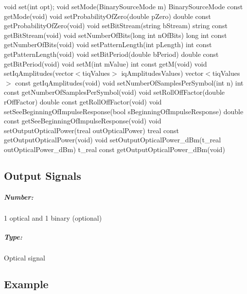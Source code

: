 void set(int opt);
\bigbreak
void setMode(BinarySourceMode m)
\bigbreak
BinarySourceMode const getMode(void)
\bigbreak
void setProbabilityOfZero(double pZero)
\bigbreak
double const getProbabilityOfZero(void)
\bigbreak
void setBitStream(string bStream)
\bigbreak
string const getBitStream(void)
\bigbreak
void setNumberOfBits(long int nOfBits)
\bigbreak
long int const getNumberOfBits(void)
\bigbreak
void setPatternLength(int pLength)
\bigbreak
int const getPatternLength(void)
\bigbreak
void setBitPeriod(double bPeriod)
\bigbreak
double const getBitPeriod(void)
\bigbreak
void setM(int mValue)
int const getM(void)
\bigbreak
void setIqAmplitudes(vector$<$t\textunderscore iqValues$>$ iqAmplitudesValues)
\bigbreak
vector$<$t\textunderscore iqValues$>$ const getIqAmplitudes(void)
\bigbreak
void setNumberOfSamplesPerSymbol(int n)
\bigbreak
int const getNumberOfSamplesPerSymbol(void)
\bigbreak
void setRollOffFactor(double rOffFactor)
\bigbreak
double const getRollOffFactor(void)
\bigbreak
void setSeeBeginningOfImpulseResponse(bool sBeginningOfImpulseResponse)
\bigbreak
double const getSeeBeginningOfImpulseResponse(void)
\bigbreak
void setOutputOpticalPower(t\textunderscore real outOpticalPower)
\bigbreak
t\textunderscore real const getOutputOpticalPower(void)
\bigbreak
void setOutputOpticalPower\_dBm(t\_real outOpticalPower\_dBm)
\bigbreak
t\_real const getOutputOpticalPower\_dBm(void)
\pagebreak

\subsection*{Output Signals}

\subparagraph*{Number:} 1 optical and 1 binary (optional)

\subparagraph*{Type:} Optical signal

\subsection*{Example}



